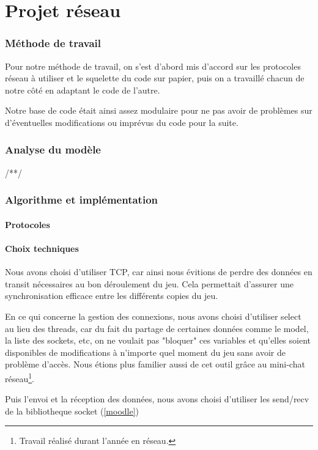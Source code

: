 \documentclass[a4paper]{article}
\begin{document}
\newpage
\part{Projet réseau}

	\section{Méthode de travail}

	Pour notre méthode de travail, on s'est d'abord mis d'accord sur les protocoles réseau à utiliser et le squelette du code sur papier, puis on a travaillé chacun de notre côté en adaptant le code de l'autre.

	Notre base de code était ainsi assez modulaire pour ne pas avoir de problèmes sur d'éventuelles modifications ou imprévus du code pour la suite.

	\section{Analyse du modèle}

	/**/

	\section{Algorithme et implémentation}
		\subsection{Protocoles}
		

		\subsection{Choix techniques}
		Nous avons choisi d'utiliser TCP, car ainsi nous évitions de perdre des données en transit nécessaires au bon déroulement du jeu. Cela permettait d'assurer une synchronisation efficace entre les différents copies du jeu.
		
		En ce qui concerne la gestion des connexions, nous avons choisi d'utiliser select au lieu des threads, car du fait du partage de certaines données comme le model, la liste des sockets, etc, on ne voulait pas "bloquer" ces variables et qu'elles soient disponibles de modifications à n'importe quel moment du jeu sans avoir de problème d'accès. Nous étions plus familier aussi de cet outil grâce au mini-chat réseau\footnote{Travail réalisé durant l'année en réseau.}.
		
		Puis l'envoi et la réception des données, nous avons choisi d'utiliser les send/recv de la bibliotheque socket (\ref{moodle})
\end{document}
